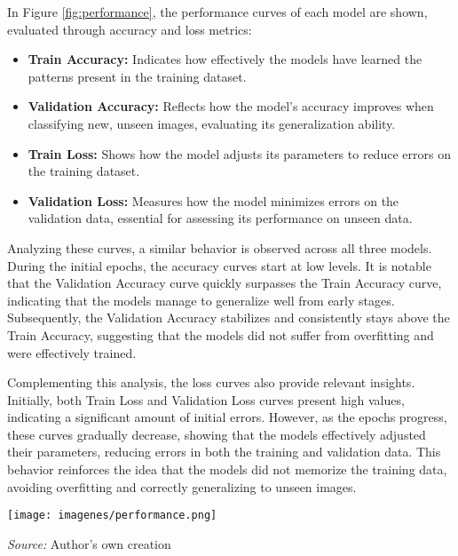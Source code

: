 In Figure \ref{fig:performance}, the performance curves of each model are shown, evaluated through accuracy and loss metrics:

\begin{itemize}
	\item \textbf{Train Accuracy:} Indicates how effectively the models have learned the patterns present in the training dataset.
	\item \textbf{Validation Accuracy:} Reflects how the model's accuracy improves when classifying new, unseen images, evaluating its generalization ability.
	\item \textbf{Train Loss:} Shows how the model adjusts its parameters to reduce errors on the training dataset.
	\item \textbf{Validation Loss:} Measures how the model minimizes errors on the validation data, essential for assessing its performance on unseen data.
\end{itemize}

Analyzing these curves, a similar behavior is observed across all three models. During the initial epochs, the accuracy curves start at low levels. It is notable that the Validation Accuracy curve quickly surpasses the Train Accuracy curve, indicating that the models manage to generalize well from early stages. Subsequently, the Validation Accuracy stabilizes and consistently stays above the Train Accuracy, suggesting that the models did not suffer from overfitting and were effectively trained.

Complementing this analysis, the loss curves also provide relevant insights. Initially, both Train Loss and Validation Loss curves present high values, indicating a significant amount of initial errors. However, as the epochs progress, these curves gradually decrease, showing that the models effectively adjusted their parameters, reducing errors in both the training and validation data. This behavior reinforces the idea that the models did not memorize the training data, avoiding overfitting and correctly generalizing to unseen images.

\begin{figure*}[htb]
	\centering
	\texttt{[image: imagenes/performance.png]}
	\caption{Performance curves of model training.}
	\scriptsize \textit{Source:} Author's own creation
	\label{fig:performance}
\end{figure*}